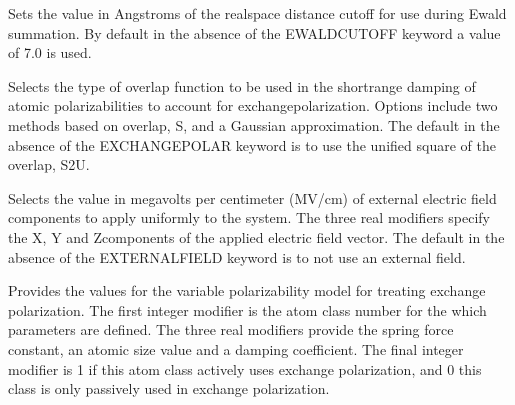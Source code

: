 \documentclass[letterpaper,11pt,english]{sphinxmanual}
\begin{document}
\ignorespaces {}\label{\detokenize{text/keywords:key-ewald-cutoff}}\begin{description}
\sphinxAtStartPar
Sets the value in Angstroms of the real\sphinxhyphen{}space distance cutoff for use during Ewald summation. By default in the absence of the EWALD\sphinxhyphen{}CUTOFF keyword a value of 7.0 is used.

\end{description}

\ignorespaces {}\label{\detokenize{text/keywords:key-exchange-polar}}\begin{description}
\sphinxAtStartPar
Selects the type of overlap function to be used in the short\sphinxhyphen{}range damping of atomic polarizabilities to account for exchange\sphinxhyphen{}polarization. Options include two methods based on overlap, S, and a Gaussian approximation. The default in the absence of the EXCHANGE\sphinxhyphen{}POLAR keyword is to use the unified square of the overlap, S2U.

\end{description}

\ignorespaces {}\label{\detokenize{text/keywords:key-external-field}}\begin{description}
\sphinxAtStartPar
Selects the value in megavolts per centimeter (MV/cm) of external electric field components to apply uniformly to the system. The three real modifiers specify the X\sphinxhyphen{}, Y\sphinxhyphen{} and Z\sphinxhyphen{}components of the applied electric field vector. The default in the absence of the EXTERNAL\sphinxhyphen{}FIELD keyword is to not use an external field.

\end{description}

\ignorespaces {}\label{\detokenize{text/keywords:key-exchpol}}\begin{description}
\sphinxAtStartPar
Provides the values for the variable polarizability model for treating exchange polarization. The first integer modifier is the atom class number for the which parameters are defined. The three real modifiers provide the spring force constant, an atomic size value and a damping coefficient. The final integer modifier is 1 if this atom class actively uses exchange polarization, and 0 this class is only passively used in exchange polarization.

\end{description}
\end{document}
